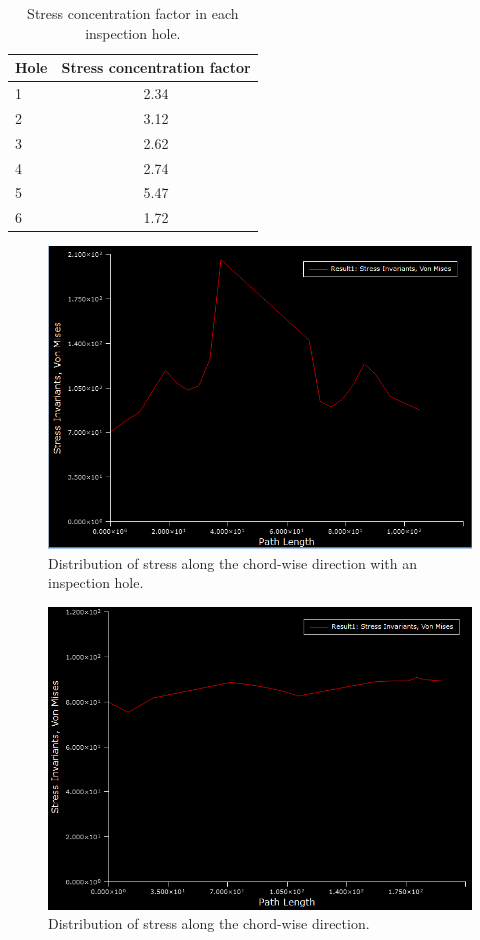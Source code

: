 \documentclass[11pt,a4paper,oneside]{memoir}
\begin{document}
\begin{table}[h]
    \centering
    \begin{tabular}{l c}
    \toprule
      Hole   &  Stress concentration factor\\
     \midrule
      1   & 2.34\\
      2 &   3.12\\
      3 &   2.62\\
      4 &   2.74\\
      5 &   5.47\\
      6 &   1.72\\
      \bottomrule
    \end{tabular}
    \caption{Stress concentration factor in each inspection hole.}
    \label{tab:stress-conc-factor}
\end{table}

\begin{figure}[h]
    \centering
    \includegraphics[width = .8\textwidth]{figures/Path-length.png}
    \caption{Distribution of stress along the chord-wise direction with an inspection hole.}
    \label{fig:stress-along-chord-hole}
\end{figure}

\begin{figure}[h]
    \centering
    \includegraphics[width = .8\textwidth]{figures/Path-length-one.png}
    \caption{Distribution of stress along the chord-wise direction.}
    \label{fig:stress-along-chord}
\end{figure}
\end{document}

